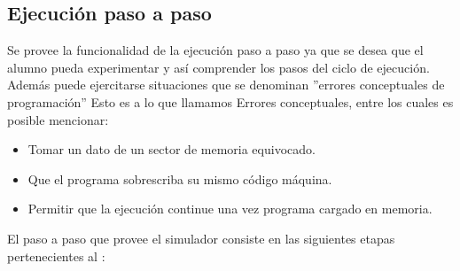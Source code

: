 \subsection{Ejecución paso a paso}

Se provee la funcionalidad de la ejecución paso a paso ya que se desea que el alumno pueda experimentar y así comprender los pasos del ciclo de ejecución. Además puede ejercitarse situaciones que se denominan ''errores conceptuales de programación'' Esto es a lo que llamamos Errores conceptuales, entre los cuales es posible mencionar:

\begin{itemize}
\item Tomar un dato de un sector de memoria equivocado.
\item Que el programa sobrescriba su mismo código máquina.
\item Permitir que la ejecución continue una vez  programa cargado en memoria.
\end{itemize}

El paso a paso que provee el simulador consiste en las siguientes etapas pertenecientes al \ciclo:

